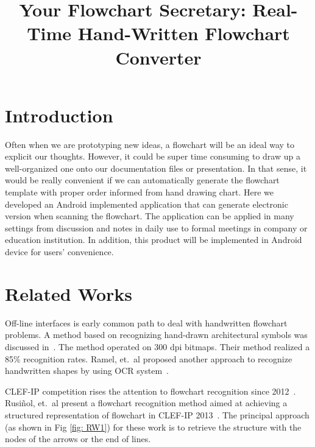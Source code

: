 \documentclass[conference,twocolumn]{IEEEtran}
\begin{document}
%
\title{Your Flowchart Secretary: Real-Time Hand-Written Flowchart Converter}



\author{
}

\maketitle

\IEEEpeerreviewmaketitle


\section{Introduction}
Often when we are prototyping new ideas, a flowchart will be an ideal way to explicit our thoughts. However, it could be super time consuming to draw up a well-organized one onto our documentation files or presentation. In that sense, it would be really convenient if we can automatically generate the flowchart template with proper order informed from hand drawing chart. Here we developed an Android implemented application that can generate electronic version when scanning the flowchart. The application can be applied in many settings from discussion and notes in daily use to formal meetings in company or education institution. In addition, this product will be implemented in Android device for users’ convenience.

\section{Related Works}
    Off-line interfaces is early common path to deal with handwritten flowchart problems. A method based on recognizing hand-drawn architectural symbols was discussed in~\cite{valveny1999}. The method operated on 300 dpi bitmaps. Their method realized a 85\% recognition rates. Ramel, et.~al proposed another approach to recognize handwritten shapes by using OCR system~\cite{Ramel1999}.
    
    CLEF-IP competition rises the attention to flowchart recognition since 2012~\cite{Morzinger2012}. Rusiñol, et.~al present a flowchart recognition method aimed at achieving a structured representation of flowchart in CLEF-IP 2013~\cite{Rusinol2014}. The principal approach (as shown in Fig \ref{fig: RW1}) for these work is to retrieve the structure with the nodes of the arrows or the end of lines.
    
\end{document}
